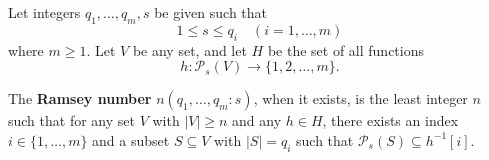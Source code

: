 Let integers $q_1, \ldots, q_m, s$ be given such that
$$1 \leq s \leq q_i \quad (i = 1, \ldots, m)$$
where $m \geq 1$. Let $V$ be any set, and let $H$ be the set of all functions
$$h: \mathcal{P}_s(V) \to \{1, 2, \ldots, m\}.$$

The \textbf{Ramsey number} $n(q_1, \ldots, q_m : s)$, when it exists, is the least integer $n$ such that for any set $V$ with $|V| \geq n$ and any $h \in H$, there exists an index $i \in \{1, \ldots, m\}$ and a subset $S \subseteq V$ with $|S| = q_i$ such that $\mathcal{P}_s(S) \subseteq h^{-1}[i]$.
